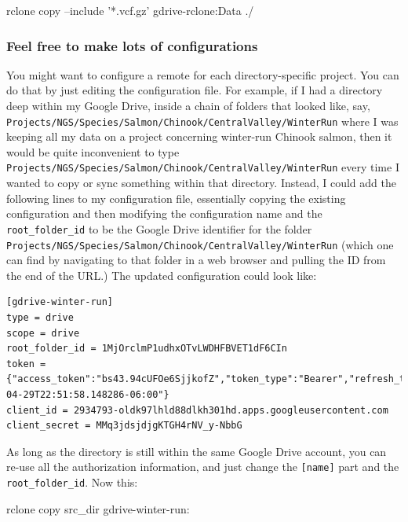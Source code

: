 \documentclass[]{krantz}
\makeatletter
\newenvironment{Shaded}{\begin{snugshade}}{\end{snugshade}}
\newcommand{\ExtensionTok}[1]{#1}
\newcommand{\NormalTok}[1]{#1}
\newcommand{\StringTok}[1]{\textcolor[rgb]{0.5,0.5,0.5}{#1}}
\newenvironment{kframe}{%
\medskip{}
\setlength{\fboxsep}{.8em}
 \def\at@end@of@kframe{}%
 \ifinner\ifhmode%
  \def\at@end@of@kframe{\end{minipage}}%
  \begin{minipage}{\columnwidth}%
 \fi\fi%
 \def\FrameCommand##1{\hskip\@totalleftmargin \hskip-\fboxsep
 \colorbox{shadecolor}{##1}\hskip-\fboxsep
     \hskip-\linewidth \hskip-\@totalleftmargin \hskip\columnwidth}%
 \MakeFramed {\advance\hsize-\width
   \@totalleftmargin\z@ \linewidth\hsize
   \@setminipage}}%
 {\par\unskip\endMakeFramed%
 \at@end@of@kframe}
\renewenvironment{Shaded}{\begin{kframe}}{\end{kframe}}
\makeatother
\begin{document}
\begin{Shaded}
\begin{Highlighting}[]
\ExtensionTok{rclone}\NormalTok{ copy --include }\StringTok{'*.vcf.gz'}\NormalTok{ gdrive-rclone:Data ./}
\end{Highlighting}
\end{Shaded}

\hypertarget{feel-free-to-make-lots-of-configurations}{%
\subsubsection{Feel free to make lots of configurations}\label{feel-free-to-make-lots-of-configurations}}

You might want to configure a remote for each directory-specific project.
You can do that by just editing the configuration file. For example,
if I had a directory deep within my Google Drive, inside a chain of folders that
looked like, say, \texttt{Projects/NGS/Species/Salmon/Chinook/CentralValley/WinterRun}
where I was keeping
all my data on a project concerning winter-run Chinook salmon, then it would be
quite inconvenient to type \texttt{Projects/NGS/Species/Salmon/Chinook/CentralValley/WinterRun}
every time I wanted to copy or sync something within that directory. Instead,
I could add the following
lines to my configuration file, essentially copying the existing configuration and
then modifying the configuration name and the \texttt{root\_folder\_id} to be the
Google Drive identifier for the folder \texttt{Projects/NGS/Species/Salmon/Chinook/CentralValley/WinterRun} (which
one can find by navigating to that folder in a web browser and pulling the ID from the
end of the URL.) The updated configuration could look like:

\begin{verbatim}
[gdrive-winter-run]
type = drive
scope = drive
root_folder_id = 1MjOrclmP1udhxOTvLWDHFBVET1dF6CIn
token = {"access_token":"bs43.94cUFOe6SjjkofZ","token_type":"Bearer","refresh_token":"1/MrtfsRoXhgc","expiry":"2019-04-29T22:51:58.148286-06:00"}
client_id = 2934793-oldk97lhld88dlkh301hd.apps.googleusercontent.com
client_secret = MMq3jdsjdjgKTGH4rNV_y-NbbG
\end{verbatim}

As long as the directory is still within the same Google Drive account, you can re-use
all the authorization information, and just change the \texttt{{[}name{]}} part and the \texttt{root\_folder\_id}.
Now this:

\begin{Shaded}
\begin{Highlighting}[]
\ExtensionTok{rclone}\NormalTok{ copy src_dir gdrive-winter-run: }
\end{Highlighting}
\end{Shaded}
\end{document}
